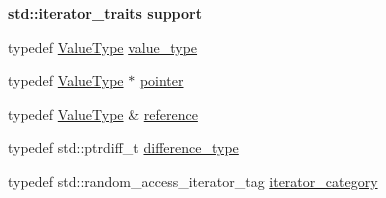 \begin{Indent}\textbf{ std\+::iterator\+\_\+traits support}\par
\begin{DoxyCompactItemize}
\item 
typedef \mbox{\hyperlink{classrapidjson_1_1_generic_member_iterator_ad2b02bbaddb3cc35db1d6a70d7850481}{Value\+Type}} \mbox{\hyperlink{classrapidjson_1_1_generic_member_iterator_afc86203583390c3b719a2c9298866a7e}{value\+\_\+type}}
\item 
typedef \mbox{\hyperlink{classrapidjson_1_1_generic_member_iterator_ad2b02bbaddb3cc35db1d6a70d7850481}{Value\+Type}} $\ast$ \mbox{\hyperlink{classrapidjson_1_1_generic_member_iterator_a72c5c50dc9df5622b0be822dad59e372}{pointer}}
\item 
typedef \mbox{\hyperlink{classrapidjson_1_1_generic_member_iterator_ad2b02bbaddb3cc35db1d6a70d7850481}{Value\+Type}} \& \mbox{\hyperlink{classrapidjson_1_1_generic_member_iterator_ab7d2d79f74f084b9b5abd42ef891536d}{reference}}
\item 
typedef std\+::ptrdiff\+\_\+t \mbox{\hyperlink{classrapidjson_1_1_generic_member_iterator_a2a981caecbc8b48968bccd6c3fa7513d}{difference\+\_\+type}}
\item 
typedef std\+::random\+\_\+access\+\_\+iterator\+\_\+tag \mbox{\hyperlink{classrapidjson_1_1_generic_member_iterator_a38b75fd16d115b5230b373207ac05b27}{iterator\+\_\+category}}
\end{DoxyCompactItemize}
\end{Indent}
